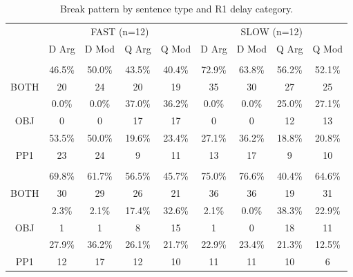 \documentclass[12pt,oneside]{book}
\begin{document}
\begin{table}[t]

\caption{\label{tab:r2split}Break pattern by sentence type and R1 delay category.}
\centering
\begin{tabular}{cccc>{}c|cccc}
\toprule
\multicolumn{1}{c}{ } & \multicolumn{4}{c}{FAST (n=12)} & \multicolumn{4}{c}{SLOW (n=12)} \\
\cmidrule(l{3pt}r{3pt}){2-5} \cmidrule(l{3pt}r{3pt}){6-9}
  & D Arg & D Mod & Q Arg & Q Mod & D Arg & D Mod & Q Arg & Q Mod\\
\midrule
\addlinespace[0.3em]
\multicolumn{9}{l}{\textbf{Reading 1}}\\
\hspace{1em} & 46.5\% & 50.0\% & 43.5\% & 40.4\% & 72.9\% & 63.8\% & 56.2\% & 52.1\%\\
\cmidrule{2-9}
\multirow{-2}{*}{\centering\arraybackslash BOTH} & 20 & 24 & 20 & 19 & 35 & 30 & 27 & 25\\
\cmidrule{1-9}
\hspace{1em} & 0.0\% & 0.0\% & 37.0\% & 36.2\% & 0.0\% & 0.0\% & 25.0\% & 27.1\%\\
\cmidrule{2-9}
\multirow{-2}{*}{\centering\arraybackslash OBJ} & 0 & 0 & 17 & 17 & 0 & 0 & 12 & 13\\
\cmidrule{1-9}
\hspace{1em} & 53.5\% & 50.0\% & 19.6\% & 23.4\% & 27.1\% & 36.2\% & 18.8\% & 20.8\%\\
\cmidrule{2-9}
\multirow{-2}{*}{\centering\arraybackslash PP1} & 23 & 24 & 9 & 11 & 13 & 17 & 9 & 10\\
\cmidrule{1-9}
\addlinespace[0.3em]
\multicolumn{9}{l}{\textbf{Reading 2}}\\
\hspace{1em} & 69.8\% & 61.7\% & 56.5\% & 45.7\% & 75.0\% & 76.6\% & 40.4\% & 64.6\%\\
\cmidrule{2-9}
\multirow{-2}{*}{\centering\arraybackslash BOTH} & 30 & 29 & 26 & 21 & 36 & 36 & 19 & 31\\
\cmidrule{1-9}
\hspace{1em} & 2.3\% & 2.1\% & 17.4\% & 32.6\% & 2.1\% & 0.0\% & 38.3\% & 22.9\%\\
\cmidrule{2-9}
\multirow{-2}{*}{\centering\arraybackslash OBJ} & 1 & 1 & 8 & 15 & 1 & 0 & 18 & 11\\
\cmidrule{1-9}
\hspace{1em} & 27.9\% & 36.2\% & 26.1\% & 21.7\% & 22.9\% & 23.4\% & 21.3\% & 12.5\%\\
\cmidrule{2-9}
\multirow{-2}{*}{\centering\arraybackslash PP1} & 12 & 17 & 12 & 10 & 11 & 11 & 10 & 6\\
\bottomrule
\end{tabular}
\end{table}
\end{document}
